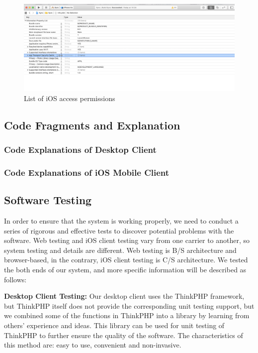 \begin{figure}[H]
  \centering
  \includegraphics[width=.8\textwidth]{authset.png} %
  \caption{List of iOS access permissions} %
  \label{au} %
\end{figure}





\subsection{Code Fragments and Explanation}
\subsubsection{Code Explanations of Desktop Client}



\subsubsection{Code Explanations of iOS Mobile Client}


\subsection{Software Testing}
\noindent In order to ensure that the system is working properly, we need to conduct a series of rigorous and effective tests to discover potential problems with the software. Web testing and iOS client testing vary from one carrier to another, so system testing and details are different. Web testing is B/S architecture and browser-based, in the contrary, iOS client testing is C/S architecture. We tested the both ends of our system, and more specific information will be  described as follows:

\vspace{0.3cm}
\noindent \textbf{Desktop Client Testing:}
\vspace{0.3cm}
\newline \noindent Our desktop client uses the ThinkPHP framework, but ThinkPHP itself does not provide the corresponding unit testing support, but we combined some of the functions in ThinkPHP into a library by learning from others' experience and ideas. This library can be used for unit testing of ThinkPHP to further ensure the quality of the software. The characteristics of this method are: easy to use, convenient and non-invasive.

